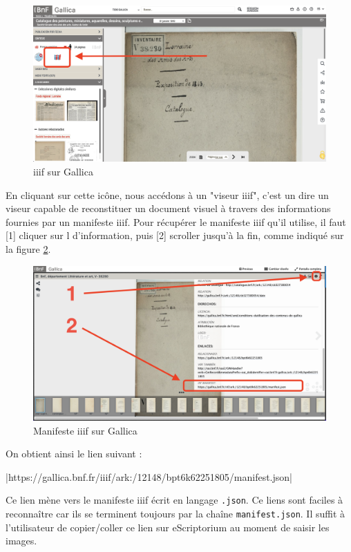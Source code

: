 \documentclass[a4paper,12pt,twoside]{book}
\begin{document}
\begin{figure}[ht]
	\centering
	\includegraphics[scale=0.3]{lien_iiif.png}		
	\caption{iiif sur Gallica}
	\label{trouver}
\end{figure}

En cliquant sur cette icône, nous accédons à un "viseur iiif", c'est un dire un viseur capable de reconstituer un document visuel à travers des informations fournies par un manifeste iiif. Pour récupérer le manifeste iiif qu'il utilise, il faut [1] cliquer sur l d'information, puis [2] scroller jusqu'à la fin, comme indiqué sur la figure \ref{scroller}.

\begin{figure}[ht]
	\centering
	\includegraphics[scale=0.3]{lien_manifest.png}		
	\caption{Manifeste iiif sur Gallica}
	\label{scroller}
\end{figure}

On obtient ainsi le lien suivant :

|https://gallica.bnf.fr/iiif/ark:/12148/bpt6k62251805/manifest.json|

Ce lien mène vers le manifeste iiif écrit en langage \texttt{.json}. Ce liens sont faciles à reconnaître car ils se terminent toujours par la chaîne \texttt{manifest.json}. Il suffit à l'utilisateur de copier/coller ce lien sur eScriptorium au moment de saisir les images. 
\end{document}
